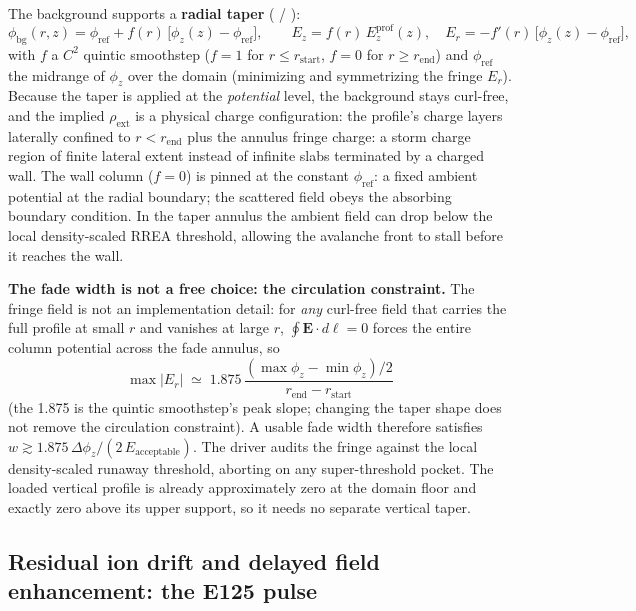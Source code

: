 \documentclass[11pt]{article}
\begin{document}
The background supports a \textbf{radial taper}
( / ):
\[
\phi_{\mathrm{bg}}(r,z) = \phi_{\mathrm{ref}}
  + f(r)\,\big[\phi_z(z) - \phi_{\mathrm{ref}}\big],
\qquad
E_z = f(r)\,E_z^{\mathrm{prof}}(z),\quad
E_r = -f'(r)\,\big[\phi_z(z)-\phi_{\mathrm{ref}}\big],
\]
with $f$ a $C^2$ quintic smoothstep ($f{=}1$ for $r \le r_{\mathrm{start}}$,
$f{=}0$ for $r \ge r_{\mathrm{end}}$) and $\phi_{\mathrm{ref}}$ the midrange
of $\phi_z$ over the domain (minimizing and symmetrizing the fringe $E_r$).
Because the taper is applied at the \emph{potential} level, the background
stays curl-free, and the implied $\rho_{\mathrm{ext}}$ is a physical charge
configuration: the profile's charge layers laterally confined to
$r < r_{\mathrm{end}}$ plus the annulus fringe charge: a storm charge
region of finite lateral extent instead of infinite slabs terminated by a
charged wall. The wall column ($f{=}0$) is pinned at the constant
$\phi_{\mathrm{ref}}$: a fixed ambient potential at the radial boundary; the scattered field obeys
the absorbing boundary condition.
In the taper annulus the ambient field can drop below the local
density-scaled RREA threshold, allowing the avalanche front to stall
before it reaches the wall.

\textbf{The fade width is not a free choice: the circulation constraint.}
The fringe field is not an implementation detail: for \emph{any} curl-free
field that carries the full profile at small $r$ and vanishes at large $r$,
$\oint \mathbf{E}\cdot d\boldsymbol{\ell} = 0$ forces the entire column
potential across the fade annulus, so
\[
\max |E_r| \;\simeq\; 1.875\,\frac{(\max\phi_z - \min\phi_z)/2}{r_{\mathrm{end}} - r_{\mathrm{start}}}
\]
(the 1.875 is the quintic smoothstep's peak slope; changing the taper shape
does not remove the circulation constraint). A usable fade width therefore
satisfies
$w \gtrsim 1.875\,\Delta\phi_z/(2\,E_{\mathrm{acceptable}})$.
The driver audits the fringe against the local density-scaled runaway
threshold, aborting on any super-threshold pocket. The loaded
vertical profile is already approximately zero
at the domain floor and exactly zero above its upper support, so it needs no
separate vertical taper.

\subsection{Residual ion drift and delayed field enhancement: the E125 pulse}
\label{sec:ion-afterglow}
\end{document}
